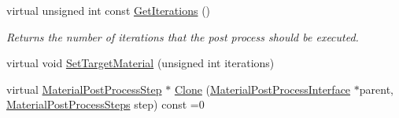 \begin{DoxyCompactItemize}
\item 
\mbox{\label{class_geometry_engine_1_1_custom_shading_1_1_material_post_process_step_a43634599ee986787ae90062e2ffb25c5}} 
virtual unsigned int const \mbox{\hyperlink{class_geometry_engine_1_1_custom_shading_1_1_material_post_process_step_a43634599ee986787ae90062e2ffb25c5}{Get\+Iterations}} ()
\begin{DoxyCompactList}\small\item\em Returns the number of iterations that the post process should be executed. \end{DoxyCompactList}\item 
virtual void \mbox{\hyperlink{class_geometry_engine_1_1_custom_shading_1_1_material_post_process_step_ab799295b4506cdcf44edd3c0cd627178}{Set\+Target\+Material}} (unsigned int iterations)
\item 
virtual \mbox{\hyperlink{class_geometry_engine_1_1_custom_shading_1_1_material_post_process_step}{Material\+Post\+Process\+Step}} $\ast$ \mbox{\hyperlink{class_geometry_engine_1_1_custom_shading_1_1_material_post_process_step_a5fd4c17faac4fea71831868027d5a516}{Clone}} (\mbox{\hyperlink{class_geometry_engine_1_1_custom_shading_1_1_material_post_process_interface}{Material\+Post\+Process\+Interface}} $\ast$parent, \mbox{\hyperlink{namespace_geometry_engine_1_1_custom_shading_af8b09b91ca7086f4f67a5d4181f35e58}{Material\+Post\+Process\+Steps}} step) const =0
\end{DoxyCompactItemize}
